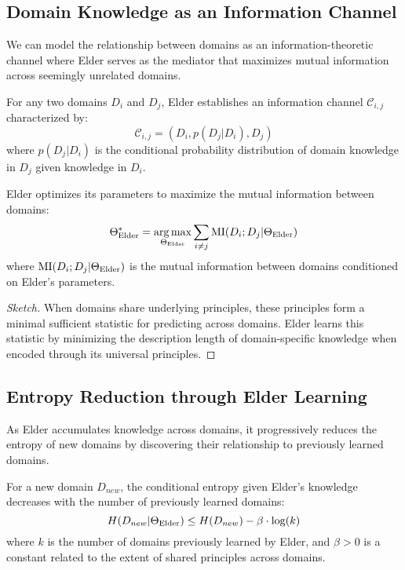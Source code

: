 \subsection{Domain Knowledge as an Information Channel}

We can model the relationship between domains as an information-theoretic channel where Elder serves as the mediator that maximizes mutual information across seemingly unrelated domains.

\begin{definition}
For any two domains $D_i$ and $D_j$, Elder establishes an information channel $\mathcal{C}_{i,j}$ characterized by:
\begin{equation}
\mathcal{C}_{i,j} = (D_i, p(D_j|D_i), D_j)
\end{equation}
where $p(D_j|D_i)$ is the conditional probability distribution of domain knowledge in $D_j$ given knowledge in $D_i$.
\end{definition}

\begin{theorem}
Elder optimizes its parameters to maximize the mutual information between domains:
\begin{equation}
\Theta_{\text{Elder}}^* = \mathop{\mathrm{arg\,max}}_{\Theta_{\text{Elder}}} \sum_{i \neq j} \text{MI}(D_i; D_j | \Theta_{\text{Elder}})
\end{equation}
where $\text{MI}(D_i; D_j | \Theta_{\text{Elder}})$ is the mutual information between domains conditioned on Elder's parameters.
\end{theorem}

\begin{proof}[Sketch]
When domains share underlying principles, these principles form a minimal sufficient statistic for predicting across domains. Elder learns this statistic by minimizing the description length of domain-specific knowledge when encoded through its universal principles.
\end{proof}

\subsection{Entropy Reduction through Elder Learning}

As Elder accumulates knowledge across domains, it progressively reduces the entropy of new domains by discovering their relationship to previously learned domains.

\begin{theorem}
For a new domain $D_{new}$, the conditional entropy given Elder's knowledge decreases with the number of previously learned domains:
\begin{equation}
H(D_{new} | \Theta_{\text{Elder}}) \leq H(D_{new}) - \beta \cdot \log(k)
\end{equation}
where $k$ is the number of domains previously learned by Elder, and $\beta > 0$ is a constant related to the extent of shared principles across domains.
\end{theorem}

